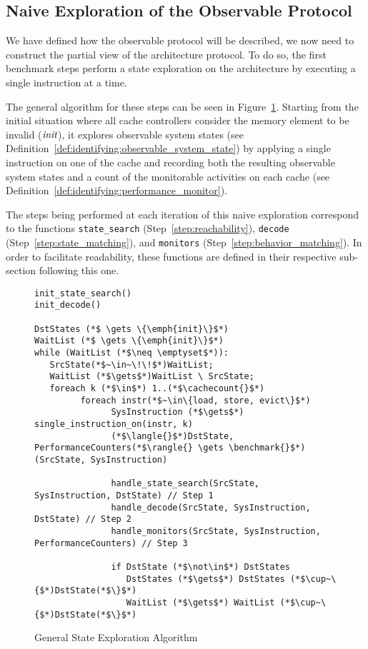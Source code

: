 \subsection{Naive Exploration of the Observable Protocol}
We have defined how the observable protocol will be described, we now need to
construct the partial view of the architecture protocol. To do so, the first
benchmark steps perform a state exploration on the architecture by executing a
single instruction at a time.

The general algorithm for these steps can be seen in
Figure~\ref{fig:identification:state_exploration}.  Starting from the initial
situation where all cache controllers consider the memory element to be invalid
($\emph{init}$), it explores observable system states (see
Definition~\ref{def:identifying:observable_system_state}) by applying a single
instruction on one of the cache and recording both the resulting observable
system states and a count of the monitorable activities on each cache (see
Definition~\ref{def:identifying:performance_monitor}).

The steps being performed at each iteration of this naive exploration correspond
to the functions \lstinline!state_search! (Step~\ref{step:reachability}),
\lstinline!decode! (Step~\ref{step:state_matching}), and \lstinline!monitors!
(Step~\ref{step:behavior_matching}). In order to facilitate readability, these
functions are defined in their respective sub-section following this one.

\begin{figure}[hbt!]
\begin{lstlisting}
init_state_search()
init_decode()

DstStates (*$ \gets \{\emph{init}\}$*)
WaitList (*$ \gets \{\emph{init}\}$*)
while (WaitList (*$\neq \emptyset$*)):
   SrcState(*$~\in~\!\!$*)WaitList;
   WaitList (*$\gets$*)WaitList \ SrcState;
   foreach k (*$\in$*) 1..(*$\cachecount{}$*)
         foreach instr(*$~\in\{load, store, evict\}$*)
               SysInstruction (*$\gets$*) single_instruction_on(instr, k)
               (*$\langle{}$*)DstState, PerformanceCounters(*$\rangle{} \gets \benchmark{}$*)(SrcState, SysInstruction)

               handle_state_search(SrcState, SysInstruction, DstState) // Step 1
               handle_decode(SrcState, SysInstruction, DstState) // Step 2
               handle_monitors(SrcState, SysInstruction, PerformanceCounters) // Step 3

               if DstState (*$\not\in$*) DstStates
                  DstStates (*$\gets$*) DstStates (*$\cup~\{$*)DstState(*$\}$*)
                  WaitList (*$\gets$*) WaitList (*$\cup~\{$*)DstState(*$\}$*)
\end{lstlisting}
\caption{General State Exploration Algorithm}
\label{fig:identification:state_exploration}
\end{figure}

